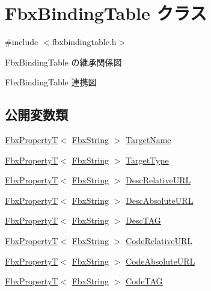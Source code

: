 \hypertarget{class_fbx_binding_table}{}\section{Fbx\+Binding\+Table クラス}
\label{class_fbx_binding_table}


{\ttfamily \#include $<$fbxbindingtable.\+h$>$}



Fbx\+Binding\+Table の継承関係図


Fbx\+Binding\+Table 連携図
\subsection*{公開変数類}
\begin{DoxyCompactItemize}
\item 
\hyperlink{class_fbx_property_t}{Fbx\+PropertyT}$<$ \hyperlink{class_fbx_string}{Fbx\+String} $>$ \hyperlink{class_fbx_binding_table_a09ebb43f4fdfafcf1842ecad60b16801}{Target\+Name}
\item 
\hyperlink{class_fbx_property_t}{Fbx\+PropertyT}$<$ \hyperlink{class_fbx_string}{Fbx\+String} $>$ \hyperlink{class_fbx_binding_table_aca964aac5ddc2238ca9d4a3cafe42486}{Target\+Type}
\item 
\hyperlink{class_fbx_property_t}{Fbx\+PropertyT}$<$ \hyperlink{class_fbx_string}{Fbx\+String} $>$ \hyperlink{class_fbx_binding_table_acb06f75ac993d6f92788beb82298775b}{Desc\+Relative\+U\+RL}
\item 
\hyperlink{class_fbx_property_t}{Fbx\+PropertyT}$<$ \hyperlink{class_fbx_string}{Fbx\+String} $>$ \hyperlink{class_fbx_binding_table_ad0c914d07b49a91d79eda8d39fda6cf7}{Desc\+Absolute\+U\+RL}
\item 
\hyperlink{class_fbx_property_t}{Fbx\+PropertyT}$<$ \hyperlink{class_fbx_string}{Fbx\+String} $>$ \hyperlink{class_fbx_binding_table_aa1ac440c2724fdc420ec3f02fa88aede}{Desc\+T\+AG}
\item 
\hyperlink{class_fbx_property_t}{Fbx\+PropertyT}$<$ \hyperlink{class_fbx_string}{Fbx\+String} $>$ \hyperlink{class_fbx_binding_table_add10ea889f7b9e37ca0fbbf27dfc140f}{Code\+Relative\+U\+RL}
\item 
\hyperlink{class_fbx_property_t}{Fbx\+PropertyT}$<$ \hyperlink{class_fbx_string}{Fbx\+String} $>$ \hyperlink{class_fbx_binding_table_a43a42110f701adae3164558d1b001275}{Code\+Absolute\+U\+RL}
\item 
\hyperlink{class_fbx_property_t}{Fbx\+PropertyT}$<$ \hyperlink{class_fbx_string}{Fbx\+String} $>$ \hyperlink{class_fbx_binding_table_ac1c73d117768ad0373d277a81e021fa3}{Code\+T\+AG}
\end{DoxyCompactItemize}
